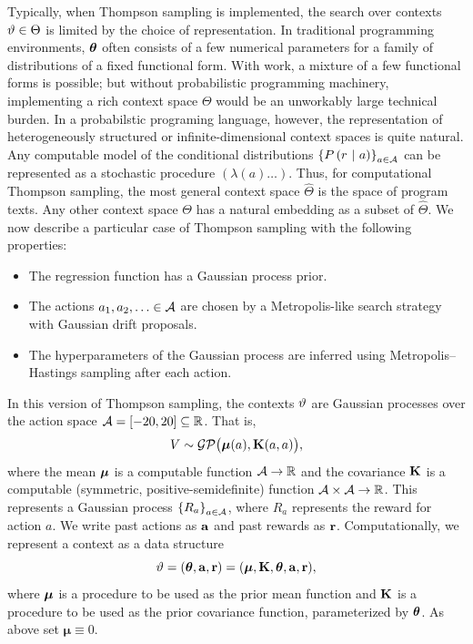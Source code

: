 Typically, when Thompson sampling is implemented, the search over contexts
$\vartheta \in \Theta$ is limited by the choice of representation.  In
traditional programming environments, $\bm{\theta}$ often consists of a few
numerical parameters for a family of distributions of a fixed functional
form.  With work, a mixture of a few functional forms is possible; but
without probabilistic programming machinery, implementing a rich context
space $\Theta$ would be an unworkably large technical burden.  In a
probabilstic programing language, however, the representation of
heterogeneously structured or infinite-dimensional context spaces is quite
natural.  Any computable model of the conditional distributions
$\left\{ P\left( r \ \middle\vert\  a \right) \right\}_{a \in \mathcal{A}}$ can be represented as a stochastic
procedure $(\lambda (a) \ldots)$.  Thus, for computational Thompson sampling,
the most general context space $\widehat\Theta$ is the space of program texts.
Any other context space $\Theta$ has a natural embedding as a subset of
$\widehat\Theta$.
\label{sec:math-spec}
We now describe a particular case of Thompson sampling with the following properties:
\begin{itemize}
  \item The regression function has a Gaussian process prior.
  \item The actions $a_1,a_2,\ldots \in \mathcal{A}$ are chosen by a Metropolis-like search
    strategy with Gaussian drift proposals.
  \item The hyperparameters of the Gaussian process are inferred using
    Metropolis--Hastings sampling after each action.
\end{itemize}

In this version of Thompson sampling, the contexts $\vartheta$ are Gaussian
processes over the action space $\mathcal{A} = [-20, 20] \subseteq \mathbb{R}$.  That is,
\[ V \sim \mathcal{GP}\big(\bm{\mu}(a), \mathbf{K}(a,a)\big), \]
where the mean $\bm{\mu}$ is a computable function $\mathcal{A} \to \mathbb{R}$ and the covariance
$\mathbf{K}$ is a computable (symmetric, positive-semidefinite) function $\mathcal{A} \times
\mathcal{A} \to \mathbb{R}$.  This represents a Gaussian process $\left\{ R_a \right\}_{a \in \mathcal{A}}$,
where $R_a$ represents the reward for action $a$. We write past actions as
$\mathbf{a}$ and past rewards as $\mathbf{r}$. Computationally, we represent
a context as a data structure
\[ \vartheta = (\bm{\theta}, \mathbf{a}, \mathbf{r}) = (\bm{\mu}, \mathbf{K},\bm{\theta}, \mathbf{a}, \mathbf{r}), \]
where $\bm{\mu}$ is a procedure to be used as the prior mean function and
$\mathbf{K}$ is a procedure to be used as the prior covariance function, parameterized by 
$\bm{\theta}$.
As above set $\bm{\mu} \equiv 0$.

